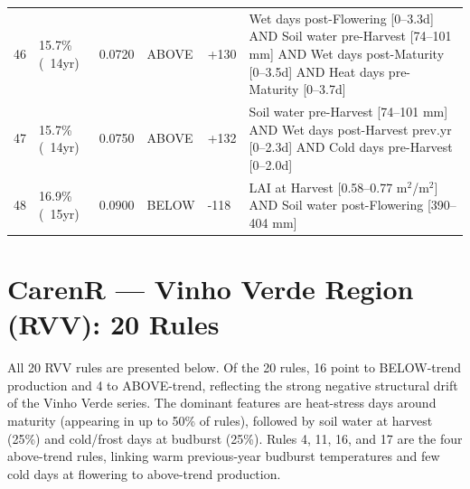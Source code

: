 {\begin{longtable}{p{0.4cm}|p{1.5cm}|p{1.2cm}|p{1.3cm}|p{1.5cm}|p{8.2cm}}
  46 & 15.7\% (~14yr) & 0.0720 & ABOVE & +130 & Wet days post-Flowering [0--3.3d] AND Soil water pre-Harvest [74--101 mm] AND Wet days post-Maturity [0--3.5d] AND Heat days pre-Maturity [0--3.7d] \\
  47 & 15.7\% (~14yr) & 0.0750 & ABOVE & +132 & Soil water pre-Harvest [74--101 mm] AND Wet days post-Harvest prev.yr [0--2.3d] AND Cold days pre-Harvest [0--2.0d] \\
  48 & 16.9\% (~15yr) & 0.0900 & BELOW & -118 & LAI at Harvest [0.58--0.77 m$^2$/m$^2$] AND Soil water post-Flowering [390--404 mm] \\
\end{longtable}
}



\section{CarenR --- Vinho Verde Region (RVV): 20 Rules}\label{app_sec:carenr_vinho_verde_region}

All 20 RVV rules are presented below. Of the 20 rules, 16 point to BELOW-trend production and 4 to ABOVE-trend, reflecting the strong negative structural drift of the Vinho Verde series. The dominant features are heat-stress days around maturity (appearing in up to 50\% of rules), followed by soil water at harvest (25\%) and cold/frost days at budburst (25\%). Rules 4, 11, 16, and 17 are the four above-trend rules, linking warm previous-year budburst temperatures and few cold days at flowering to above-trend production.


